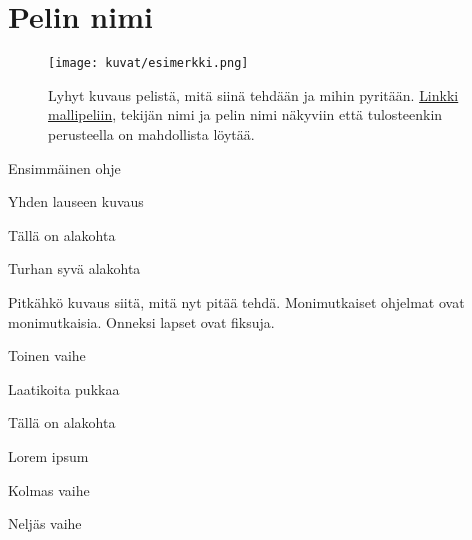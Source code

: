 \documentclass[12pt,twoside]{article}
\newenvironment{vaihetaso1}{%
    \LARGE
    \itemize
}{%
    \enditemize
}
\newenvironment{vaihetaso2}{%
    \Large
    \itemize
}{%
    \enditemize
}
\newenvironment{vaihetaso3}{%
    \large
    \itemize
}{%
    \enditemize
}
\begin{document}
\selectfont
\section*{Pelin nimi}

\begin{SCfigure}[][h]
  \centering
  \captionsetup{labelformat=empty}
  \caption{Lyhyt kuvaus pelistä, mitä siinä tehdään ja mihin pyritään. \href{https://google.fi}{Linkki mallipeliin}, tekijän nimi ja pelin nimi näkyviin että tulosteenkin perusteella on mahdollista löytää.}
  \texttt{[image: kuvat/esimerkki.png]}
\end{SCfigure}

\begin{vaihetaso1}
	\item Ensimmäinen ohje
	\begin{vaihetaso2}
		\item Yhden lauseen kuvaus
		\item Tällä on alakohta
		\begin{vaihetaso3}
			\item Turhan syvä alakohta
		\end{vaihetaso3}
		\item Pitkähkö kuvaus siitä, mitä nyt pitää tehdä. Monimutkaiset ohjelmat ovat monimutkaisia. Onneksi lapset ovat fiksuja.
	\end{vaihetaso2}
	\item Toinen vaihe
	\begin{vaihetaso2}
		\item Laatikoita pukkaa
		\item Tällä on alakohta
		\item Lorem ipsum
	\end{vaihetaso2}
	\item Kolmas vaihe
	\item Neljäs vaihe
\end{vaihetaso1}
\end{document}
